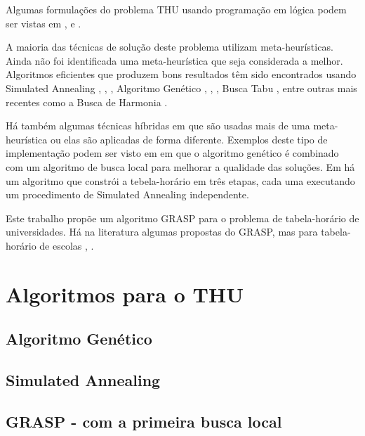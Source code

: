 \documentclass[11pt]{article}
\begin{document}
Algumas formulações do problema THU usando programação em lógica podem ser vistas em \cite{Gueret95buildinguniversity}, \cite{Goltz99universitytimetabling} e \cite{springerlink:10.1007/s10479-012-1081-x}.

A maioria das técnicas de solução deste problema utilizam meta-heurísticas. Ainda não foi identificada uma meta-heurística que seja considerada a melhor.  Algoritmos eficientes que produzem bons resultados têm sido encontrados usando Simulated Annealing \cite{3-phaseSA}, \cite{sa_hyper_heuristica}, \cite{Elmohamed98acomparison}, Algoritmo Genético \cite{Erben95agenetic}, \cite{suyanto}, \cite{Kanoh:2008:KGA:1460198.1460201}, Busca Tabu \cite{elloumi2008}, entre outras mais recentes como a Busca de Harmonia \cite{albetar_harmony}.

Há também algumas técnicas híbridas em que são usadas mais de uma meta-heurística ou elas são aplicadas de forma diferente. Exemplos deste tipo de implementação podem ser visto em \cite{massoodian2008} em que o algoritmo genético é combinado com um algoritmo de busca local para melhorar a qualidade das soluções. Em \cite{3-phaseSA} há um algoritmo que constrói a tebela-horário em três etapas, cada uma executando um procedimento de Simulated Annealing independente.

Este trabalho propõe um algoritmo GRASP para o problema de tabela-horário de universidades. Há na literatura algumas propostas do GRASP, mas para tabela-horário de escolas \cite{Souza:2004}, \cite{Vieira_agrasp}.



\section{Algoritmos para o THU}
\label{sec:algoritmos}



\subsection{Algoritmo Genético}

\subsection{Simulated Annealing}

\subsection{GRASP - com a primeira busca local}
\end{document}
